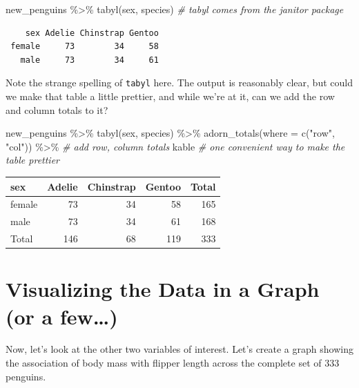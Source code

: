 \documentclass[
]{book}
\newenvironment{Shaded}{\begin{snugshade}}{\end{snugshade}}
\newcommand{\AttributeTok}[1]{\textcolor[rgb]{0.77,0.63,0.00}{#1}}
\newcommand{\CommentTok}[1]{\textcolor[rgb]{0.56,0.35,0.01}{\textit{#1}}}
\newcommand{\FunctionTok}[1]{\textcolor[rgb]{0.00,0.00,0.00}{#1}}
\newcommand{\NormalTok}[1]{#1}
\newcommand{\SpecialCharTok}[1]{\textcolor[rgb]{0.00,0.00,0.00}{#1}}
\newcommand{\StringTok}[1]{\textcolor[rgb]{0.31,0.60,0.02}{#1}}
\begin{document}
\begin{Shaded}
\begin{Highlighting}[]
\NormalTok{new\_penguins }\SpecialCharTok{\%\textgreater{}\%} 
    \FunctionTok{tabyl}\NormalTok{(sex, species) }\CommentTok{\# tabyl comes from the janitor package}
\end{Highlighting}
\end{Shaded}

\begin{verbatim}
    sex Adelie Chinstrap Gentoo
 female     73        34     58
   male     73        34     61
\end{verbatim}

Note the strange spelling of \texttt{tabyl} here. The output is reasonably clear, but could we make that table a little prettier, and while we're at it, can we add the row and column totals to it?

\begin{Shaded}
\begin{Highlighting}[]
\NormalTok{new\_penguins }\SpecialCharTok{\%\textgreater{}\%} 
    \FunctionTok{tabyl}\NormalTok{(sex, species) }\SpecialCharTok{\%\textgreater{}\%}
    \FunctionTok{adorn\_totals}\NormalTok{(}\AttributeTok{where =} \FunctionTok{c}\NormalTok{(}\StringTok{"row"}\NormalTok{, }\StringTok{"col"}\NormalTok{)) }\SpecialCharTok{\%\textgreater{}\%} \CommentTok{\# add row, column totals}
\NormalTok{    kable  }\CommentTok{\# one convenient way to make the table prettier}
\end{Highlighting}
\end{Shaded}

\begin{tabular}{l|r|r|r|r}
\hline
sex & Adelie & Chinstrap & Gentoo & Total\\
\hline
female & 73 & 34 & 58 & 165\\
\hline
male & 73 & 34 & 61 & 168\\
\hline
Total & 146 & 68 & 119 & 333\\
\hline
\end{tabular}

\hypertarget{visualizing-the-data-in-a-graph-or-a-few}{%
\section{Visualizing the Data in a Graph (or a few\ldots)}\label{visualizing-the-data-in-a-graph-or-a-few}}

Now, let's look at the other two variables of interest. Let's create a graph showing the association of body mass with flipper length across the complete set of 333 penguins.
\end{document}
